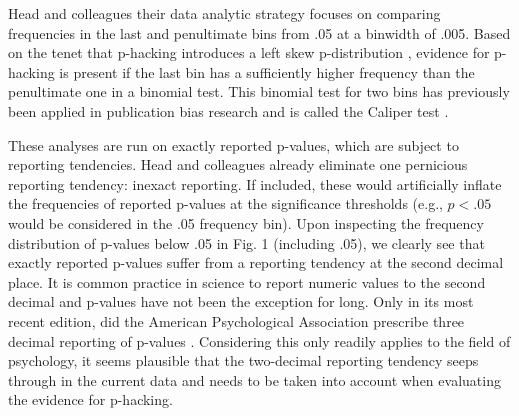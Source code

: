 Head and colleagues their data analytic strategy focuses on comparing frequencies in the last and penultimate bins from .05 at a binwidth of .005. Based on the tenet that p-hacking introduces a left skew p-distribution \cite{Simonsohn2014}, evidence for p-hacking is present if the last bin has a sufficiently higher frequency than the penultimate one in a binomial test. This binomial test for two bins has previously been applied in publication bias research and is called the Caliper test \cite{gerber2010, kuhberger2014}.

These analyses are run on exactly reported p-values, which are subject to reporting tendencies. Head and colleagues already eliminate one pernicious reporting tendency: inexact reporting. If included, these would artificially inflate the frequencies of reported p-values at the significance thresholds (e.g., $p<.05$ would be considered in the .05 frequency bin). Upon inspecting the frequency distribution of p-values below .05 in Fig. 1 (including .05), we clearly see that exactly reported p-values suffer from a reporting tendency at the second decimal place. It is common practice in science to report numeric values to the second decimal and p-values have not been the exception for long. Only in its most recent edition, did the American Psychological Association prescribe three decimal reporting of p-values \cite{AmericanPsychologicalAssociation2010}. Considering this only readily applies to the field of psychology, it seems plausible that the two-decimal reporting tendency seeps through in the current data and needs to be taken into account when evaluating the evidence for p-hacking. 